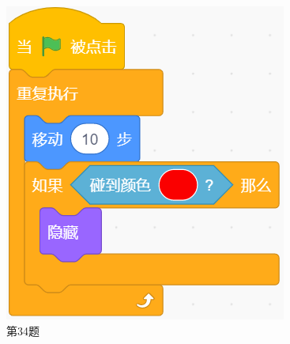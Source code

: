 \documentclass[10pt, a4paper]{article}
\begin{document}
\begin{enumerate}
\begin{figure}[htbp]
\begin{minipage}[t]{.16\textwidth}
                \includegraphics[width=\textwidth]{34.png}
                \caption*{第34题}
            \end{minipage}
            \begin{minipage}[t]{.11\textwidth}
                \centering

\end{minipage}
\end{figure}
\end{enumerate}
\end{document}
